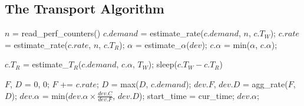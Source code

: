 \subsection{The Transport Algorithm}
\label{subsec:proto-alg}

\begin{algorithm}[t]
\caption{Transport Algorithm.}\label{alg:proto-alg}
\small
\begin{algorithmic}[1]    

        \State \(n\) = read_perf_counters() 
        \State \(c.demand\) = estimate_rate(\(c.demand\), \(n\), \(c.T_W\));
        \State \(c.rate\) = estimate_rate(\(c.rate\), \(n\), \(c.T_R\));  
            \State \(\alpha\) = estimate_\(\alpha\)(\(dev\));
            \State \(c.\alpha\) = min(\(\alpha\), \(c.\alpha\)); %
        \EndFor
    
        \State \(c.T_R\) = estimate_\(T_R\)(\(c.demand\), \(c.\alpha\), \( T_W\)); 
        \State sleep(\(c.T_W - c.T_R\))  
    \EndProcedure

            \State \(F\), \(D\) = 0, 0; 
                \State \(F\) += \(c.rate\);
                \State \(D\) = max(\(D\), \(c.demand\));
            \EndFor
            \State \(dev.F\), \(dev.D\) = agg_rate(\(F\), \(D\)); 
            \State \(dev.\alpha\) = min(\(dev.\alpha \times \frac{dev.C}{dev.F}\), \(dev.D\));  
            \EndIf
            \State start_time = cur_time;
        \EndIf         
        \State \Return \(dev.\alpha\);        
    \EndProcedure  


\end{algorithmic}
\end{algorithm}
